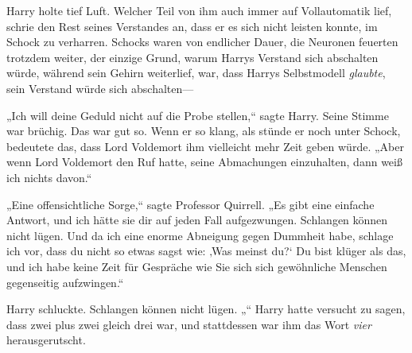 Harry holte tief Luft. Welcher Teil von ihm auch immer auf Vollautomatik lief, schrie den Rest seines Verstandes an, dass er es sich nicht leisten konnte, im Schock zu verharren. Schocks waren von endlicher Dauer, die Neuronen feuerten trotzdem weiter, der einzige Grund, warum Harrys Verstand sich abschalten würde, während sein Gehirn weiterlief, war, dass Harrys Selbstmodell \emph{glaubte}, sein Verstand würde sich abschalten—

„Ich will deine Geduld nicht auf die Probe stellen,“ sagte Harry.
Seine Stimme war brüchig. Das war gut so. Wenn er so klang, als stünde er noch unter Schock, bedeutete das, dass Lord Voldemort ihm vielleicht mehr Zeit geben würde.
„Aber wenn Lord Voldemort den Ruf hatte, seine Abmachungen einzuhalten, dann weiß ich nichts davon.“

„Eine offensichtliche Sorge,“ sagte Professor Quirrell. „Es gibt eine einfache Antwort, und ich hätte sie dir auf jeden Fall aufgezwungen. Schlangen können nicht lügen. Und da ich eine enorme Abneigung gegen Dummheit habe, schlage ich vor, dass du nicht so etwas sagst wie: ‚Was meinst du?‘ Du bist klüger als das, und ich habe keine Zeit für Gespräche wie Sie sich sich gewöhnliche Menschen gegenseitig aufzwingen.“

Harry schluckte. Schlangen können nicht lügen. „“
Harry hatte versucht zu sagen, dass zwei plus zwei gleich drei war, und stattdessen war ihm das Wort \emph{vier} herausgerutscht.

